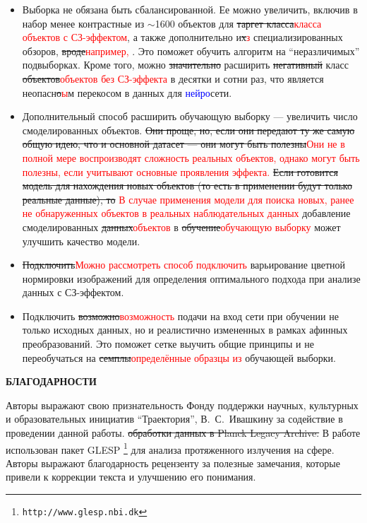 \documentclass[
aps,%
12pt,%
final,%
notitlepage,%
oneside,%
onecolumn,%
nobibnotes,%
nofootinbib,%
superscriptaddress,%
noshowpacs,%
centertags]%
{revtex4}
\begin{document}
\begin{itemize}
    \item Выборка не обязана быть сбалансированной. Ее можно увеличить, включив в набор менее контрастные из $\sim$1600 объектов для \sout{таргет класса}\textcolor{red}{класса объектов с СЗ-эффектом}, а также дополнительно и\sout{х}\textcolor{red}{з} специализированных обзоров, \sout{вроде}\textcolor{red}{например,} \cite{act_zs}. Это поможет обучить алгоритм на ``неразличимых'' подвыборках. Кроме того, можно \sout{значительно} расширить \sout{негативный} класс \sout{объектов}\textcolor{red}{объектов без СЗ-эффекта} в десятки и сотни раз, что является неопасн\sout{о}\textcolor{red}{ы}м перекосом в данных для \textcolor{blue}{нейро}сети.
    \item Дополнительный способ расширить обучающую выборку --- увеличить число смоделированных объектов. \sout{Они проще, но, если они передают ту же самую общую идею, что и основной датасет --- они могут быть полезны}\textcolor{red}{Они не в полной мере воспроизводят сложность реальных объектов, однако могут быть полезны, если учитывают основные проявления эффекта.} \sout{Если готовится модель для нахождения новых объектов (то есть в применении будут только реальные  данные), то} \textcolor{
    red}{В случае применения модели для поиска новых, ранее не обнаруженных объектов в реальных наблюдательных данных} добавление смоделированных \sout{данных}\textcolor{
    red}{объектов} в \sout{обучение}\textcolor{red}{обучающую выборку} может улучшить  качество модели.
    \item \sout{Подключить}\textcolor{red}{Можно рассмотреть способ подключить} варьирование цветной нормировки изображений для определения оптимального подхода при анализе данных с СЗ-эффектом.
    \item Подключить \sout{возможно}\textcolor{red}{возможность} подачи на вход сети при обучении не только исходных данных, но и реалистично измененных в рамках афинных преобразований. Это поможет сетке выучить общие принципы и не переобучаться на \sout{семплы}\textcolor{red}{определённые образцы из} обучающей выборки.
\end{itemize}

{\small
{\bf БЛАГОДАРНОСТИ}

Авторы выражают свою признательность Фонду поддержки научных, культурных и образовательных инициатив ``Траектория'', В.~С.~Ивашкину за содействие в проведении данной работы. 
\sout{обработки данных в Planck Legacy Archive.}
В работе  использован пакет GLESP \footnote{\tt http://www.glesp.nbi.dk} для анализа протяженного излучения на сфере. 
Авторы выражают благодарность рецензенту за полезные замечания, которые привели к коррекции текста и улучшению его понимания.}
\end{document}
